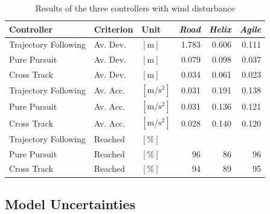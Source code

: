 \begin{table}[h]
\begin{center}
 \begin{tabular}{lll|rrr}
 \hline
 Controller & Criterion & Unit & \textit{Road} & \textit{Helix} & \textit{Agile} \\ \hline \hline
 Trajectory Following & Av. Dev. & $[\si{\meter}]$ & 1.783 & 0.606 & 0.111 \\
 Pure Pursuit         & Av. Dev. & $[\si{\meter}]$ & 0.079 & 0.098 & 0.037 \\
 Cross Track          & Av. Dev. & $[\si{\meter}]$ & 0.034 & 0.061 & 0.023 \\

 Trajectory Following & Av. Acc. & $[\si{\meter\per\square\second}]$ & 0.031 & 0.191 & 0.138 \\
 Pure Pursuit         & Av. Acc. & $[\si{\meter\per\square\second}]$ & 0.031 & 0.136 & 0.121 \\
 Cross Track          & Av. Acc. & $[\si{\meter\per\square\second}]$ & 0.028 & 0.140 & 0.120 \\
 
 Trajectory Following & Reached & $[\si{\percent}]$ & \ktilde100 & \ktilde100 & \ktilde100 \\
 Pure Pursuit         & Reached & $[\si{\percent}]$ &  96 &  86 &  96 \\
 Cross Track          & Reached & $[\si{\percent}]$ &  94 &  89 &  95 \\
 \hline
 \end{tabular}
 \caption{Results of the three controllers with wind disturbance}\vspace{1px}
 \label{tab:results_wind_disturbance}
\end{center}
\end{table}


\subsection{Model Uncertainties}
\label{sub:results_model_uncertainties}

